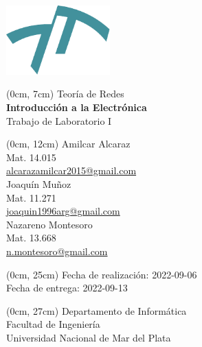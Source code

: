 \newcommand{\materia}[1]{{\huge #1}\\\vspace{0.5cm}}
\newcommand{\titulo}[1]{{\Huge \textbf{#1}}\\\vspace{0.5cm}}
\newcommand{\subtitulo}[1]{{\huge #1}\\\vspace{0.5cm}}
\newcommand{\autor}[3]{#1\\{\small Mat. #2\\\href{mailto:#3}{#3}}\\\vspace{0.7cm}}
\newcommand{\fecha}[4]{{\small Fecha de #1: #4-#3-#2}\\} %
\newcommand{\departamento}[1]{{\small Departamento de #1\\Facultad de Ingeniería\\Universidad Nacional de Mar del Plata}}
\newenvironment{mytitlepage}
    {\pagenumbering{gobble}\begin{center}}
    {\end{center}\newpage\pagenumbering{arabic}}

\begin{mytitlepage}
    \includegraphics[width=4cm]{img/logo-fi.pdf}
   
    \begin{textblock*}{\paperwidth}(0cm, 7cm)
    \materia{Teoría de Redes}
    \titulo{Introducción a la Electrónica}
    \subtitulo{Trabajo de Laboratorio I}
    \end{textblock*}
    
    \begin{textblock*}{\paperwidth}(0cm, 12cm)
    \autor{Amilcar Alcaraz}{14.015}{alcarazamilcar2015@gmail.com}
    \autor{Joaquín Muñoz}{11.271}{joaquin1996arg@gmail.com}
    \autor{Nazareno Montesoro}{13.668}{n.montesoro@gmail.com}
    \end{textblock*}
    
    \begin{textblock*}{\paperwidth}(0cm, 25cm) 
    \fecha{realización}{06}{09}{2022}
    \fecha{entrega}{13}{09}{2022}
    \end{textblock*}
    
    \begin{textblock*}{\paperwidth}(0cm, 27cm) 
    \departamento{Informática}
    \end{textblock*}
\end{mytitlepage}
